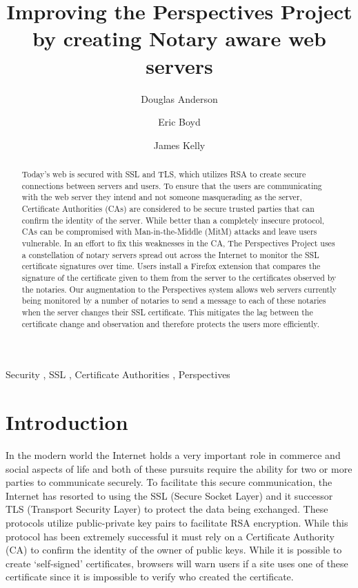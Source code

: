 \documentclass[preprint,review,12pt]{elsarticle}
\begin{document}
\begin{frontmatter}

\title{Improving the Perspectives Project by creating Notary aware web servers}

\author[doug]{Douglas Anderson}
\author[eric]{Eric Boyd}
\author[james]{James Kelly}
\address[doug]{dander01@uoguelph.ca}
\address[eric]{boyde@uoguelph.ca}
\address[james]{kellyj@uoguelph.ca}


\begin{abstract}

Today's web is secured with SSL and TLS, which utilizes RSA to create secure
connections between servers and users. To ensure that the users are
communicating with the web server they intend and not someone masquerading as
the server, Certificate Authorities (CAs) are considered to be secure trusted
parties that can confirm the identity of the server. While better than a
completely insecure protocol, CAs can be compromised with Man-in-the-Middle
(MitM) attacks and leave users vulnerable. In an effort to fix this weaknesses
in the CA, The Perspectives Project uses a constellation of notary servers
spread out across the Internet to monitor the SSL certificate signatures over
time. Users install a Firefox extension that compares the signature of the
certificate given to them from the server to the certificates observed by the
notaries. Our augmentation to the Perspectives system allows web servers
currently being monitored by a number of notaries to send a message to each of
these notaries when the server changes their SSL certificate. This mitigates
the lag between the certificate change and observation and therefore protects
the users more efficiently.

\end{abstract}

\begin{keyword}
Security \sep
SSL \sep
Certificate Authorities \sep
Perspectives
\end{keyword}

\end{frontmatter}

\section{Introduction}
\label{intro}

In the modern world the Internet holds a very important role in commerce and
social aspects of life and both of these pursuits require the ability for two
or more parties to communicate securely. To facilitate this secure
communication, the Internet has resorted to using the SSL (Secure Socket Layer)
and it successor TLS (Transport Security Layer) to protect the data being
exchanged.  These protocols utilize public-private key pairs to facilitate RSA
encryption.  While this protocol has been extremely successful it must rely on
a Certificate Authority (CA) to confirm the identity of the owner of public
keys. While it is possible to create `self-signed' certificates, browsers will
warn users if a site uses one of these certificate since it is impossible to
verify who created the certificate. 
\end{document}
